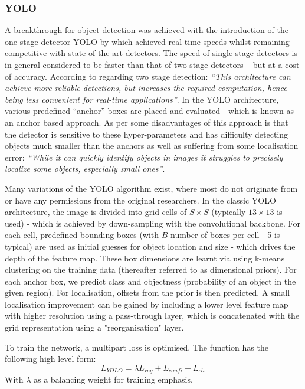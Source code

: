 \documentclass[a4paper,twoside,12pt]{report}
\begin{document}
\subsubsection{YOLO}

A breakthrough for object detection was achieved with the introduction of the one-stage detector YOLO by \cite{yolo} which achieved real-time speeds whilst remaining competitive with state-of-the-art detectors. The speed of single stage detectors is in general considered to be faster than that of two-stage detectors -- but at a cost of accuracy. According to \cite{stagecomp} regarding two stage detection: \textit{``This architecture can achieve more reliable detections, but increases the required computation, hence being less convenient for real-time applications''}. In the YOLO architecture, various predefined ``anchor'' boxes are placed and evaluated - which is known as an anchor based approach. As per \cite{yolo} some disadvantages of this approach is that the detector is sensitive to these hyper-parameters and has difficulty detecting objects much smaller than the anchors as well as suffering from some localisation error: \textit{``While it can quickly identify objects in images it struggles to precisely localize some objects, especially small ones''}.

Many variations of the YOLO algorithm exist, where most do not originate from or have any permissions from the original researchers. In the classic YOLO architecture, the image is divided into grid cells of $S\times S$ (typically $13\times 13$ is used) - which is achieved by down-sampling with the convolutional backbone. For each cell, predefined bounding boxes (with $B$ number of boxes per cell - 5 is typical) are used as initial guesses for object location and size - which drives the depth of the feature map. These box dimensions are learnt via using k-means clustering on the training data (thereafter referred to as dimensional priors). For each anchor box, we predict class and objectness (probability of an object in the given region). For localisation, offsets from the prior is then predicted. A small localisation improvement can be gained by including a lower level feature map with higher resolution using a pass-through layer, which is concatenated with the grid representation using a "reorganisation" layer. \citep{comprehensive}

To train the network, a multipart loss is optimised. The function has the following high level form:
\begin{equation}
L_{YOLO} =  \lambda L_{reg} + L_{confi} + L_{cls} 
\end{equation} 
With $\lambda$ as a balancing weight for training emphasis.
\end{document}
